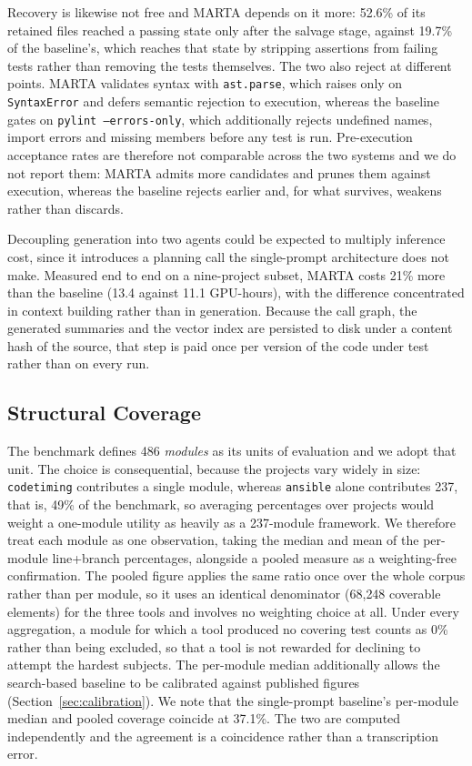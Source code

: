 \documentclass{llncs}
\begin{document}
Recovery is likewise not free and MARTA depends on it more: 52.6\% of its retained
files reached a passing state only after the salvage stage, against 19.7\% of the
baseline's, which reaches that state by stripping assertions from failing tests
rather than removing the tests themselves. The two also reject at different points. MARTA
validates syntax with \texttt{ast.parse}, which raises only on \texttt{SyntaxError}
and defers semantic rejection to execution, whereas the baseline gates on
\texttt{pylint --errors-only}, which additionally rejects undefined names, import
errors and missing members before any test is run. Pre-execution acceptance rates are
therefore not comparable across the two systems and we do not report them: MARTA
admits more candidates and prunes them against execution, whereas the baseline
rejects earlier and, for what survives, weakens rather than discards.

Decoupling generation into two agents could be expected to multiply inference cost,
since it introduces a planning call the single-prompt architecture does not make.
Measured end to end on a nine-project subset, MARTA costs 21\% more than the baseline
(13.4 against 11.1 GPU-hours), with the difference concentrated in context building
rather than in generation. Because the call graph, the generated summaries and the
vector index are persisted to disk under a content hash of the source, that step is
paid once per version of the code under test rather than on every run.

\subsection{Structural Coverage}
\label{sec:coverage}

The benchmark defines 486 \emph{modules} as its units of evaluation
\cite{lemieux2023codamosa} and we adopt that unit. The choice is consequential,
because the projects vary widely in size:
\texttt{codetiming} contributes a single module, whereas \texttt{ansible} alone
contributes 237, that is, 49\% of the benchmark, so averaging percentages over
projects would weight a one-module utility as heavily as a 237-module framework. We
therefore treat each module as one observation, taking the median and mean of the
per-module line+branch percentages, alongside a pooled measure as a weighting-free
confirmation. The pooled figure applies the same ratio once over the whole corpus
rather than per module, so it uses an identical denominator (68{,}248 coverable
elements) for the three tools and involves no weighting choice at all. Under every
aggregation, a module for which a tool produced no covering test counts as 0\% rather
than being excluded, so that a tool is not rewarded for declining to attempt the
hardest subjects. The per-module median additionally allows the search-based baseline
to be calibrated against published figures (Section~\ref{sec:calibration}). We note
that the single-prompt baseline's per-module median and pooled coverage coincide at
37.1\%. The two are computed independently and the agreement is a coincidence rather
than a transcription error.
\end{document}
